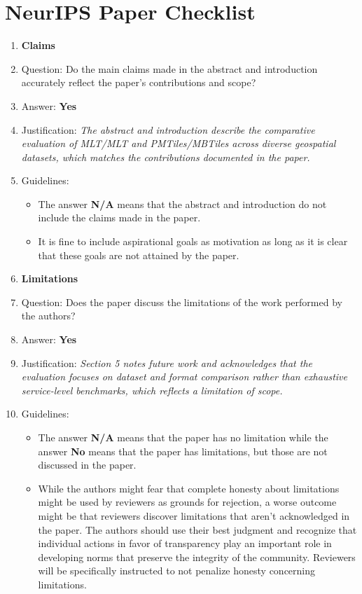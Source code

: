 \section*{NeurIPS Paper Checklist}

\newcommand{\answerYes}{\textbf{Yes}}
\newcommand{\answerNo}{\textbf{No}}
\newcommand{\answerNA}{\textbf{N/A}}
\newcommand{\justification}[1]{\textit{#1}}

\begin{enumerate}

\item {\bf Claims}
    \item[] Question: Do the main claims made in the abstract and introduction accurately reflect the paper's contributions and scope?
    \item[] Answer: \answerYes{}
    \item[] Justification: \justification{The abstract and introduction describe the comparative evaluation of MLT/MLT and PMTiles/MBTiles across diverse geospatial datasets, which matches the contributions documented in the paper.}
    \item[] Guidelines:
    \begin{itemize}
        \item The answer \answerNA{} means that the abstract and introduction do not include the claims made in the paper.
        \item It is fine to include aspirational goals as motivation as long as it is clear that these goals are not attained by the paper.
    \end{itemize}

\item {\bf Limitations}
    \item[] Question: Does the paper discuss the limitations of the work performed by the authors?
    \item[] Answer: \answerYes{}
    \item[] Justification: \justification{Section 5 notes future work and acknowledges that the evaluation focuses on dataset and format comparison rather than exhaustive service-level benchmarks, which reflects a limitation of scope.}
    \item[] Guidelines:
    \begin{itemize}
        \item The answer \answerNA{} means that the paper has no limitation while the answer \answerNo{} means that the paper has limitations, but those are not discussed in the paper.
        \item While the authors might fear that complete honesty about limitations might be used by reviewers as grounds for rejection, a worse outcome might be that reviewers discover limitations that aren't acknowledged in the paper. The authors should use their best judgment and recognize that individual actions in favor of transparency play an important role in developing norms that preserve the integrity of the community. Reviewers will be specifically instructed to not penalize honesty concerning limitations.
    \end{itemize}


\end{enumerate}
